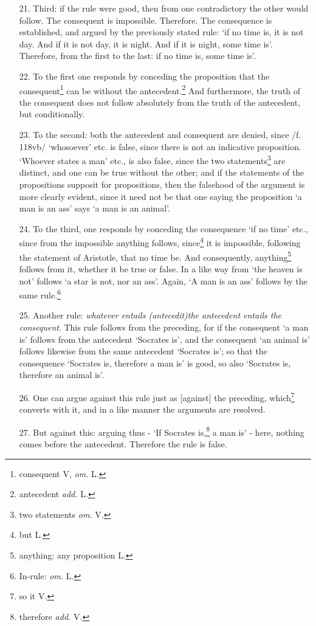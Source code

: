 \documentclass[]{article}
\begin{document}
\begin{enumerate}
	\item[21.] Third: if the rule were good, then from one contradictory the other would follow. The consequent is impossible. Therefore. The consequence is established, and argued by the previously stated rule: `if no time is, it is not day. And if it is not day, it is night. And if it is night, some time is'. Therefore, from the first to the last: if no time is, some time is'. 
	\item[22.] To the first one responds by conceding the proposition that the consequent\footnote{consequent V, \textit{om.} L.} can be without the antecedent.\footnote{antecedent \textit{add.} L.} And furthermore, the truth of the consequent does not follow absolutely from the truth of the antecedent, but conditionally.
	\item[23.] To the second: both the antecedent and consequent are denied, since /f. 118vb/ `whosoever' etc. is false, since there is not an indicative proposition. `Whoever states a man' etc., is also false, since the two statements\footnote{two statements \textit{om.} V.} are distinct, and one can be true without the other; and if the statements of the propositions supposit for propositions, then the falsehood of the argument is more clearly evident, since it need not be that one saying the proposition `a man is an ass' says `a man is an animal'. 
	\item[24.] To the third, one responds by conceding the consequence `if no time' etc., since from the impossible anything follows, since\footnote{but L.} it is impossible, following the statement of Aristotle, that no time be. And consequently, anything\footnote{anything: any proposition L.} follows from it, whether it be true or false. In a like way from `the heaven is not' follows `a star is not, nor an ass'. Again, `A man is an ass' follows by the same rule.\footnote{In-rule: \textit{om.} L.} 
	\item[25.] Another rule: \textit{whatever entails (\textit{antecedit})the antecedent entails the consequent}. This rule follows from the preceding, for if the consequent `a man is' follows from the antecedent `Socrates is', and the consequent `an animal is' follows likewise from the same antecedent `Socrates is'; so that the consequence `Socrates is, therefore a man is' is good, so also `Socrates is, therefore an animal is'. 
	\item[26.] One can argue against this rule just as [against] the preceding, which\footnote{so it V.} converts with it, and in a like manner the arguments are resolved. 
	\item[27.] But against this: arguing thus - `If Socrates is,\footnote{therefore \textit{add.} V.} a man is' - here, nothing comes before the antecedent. Therefore the rule is false. 

\end{enumerate}
\end{document}
